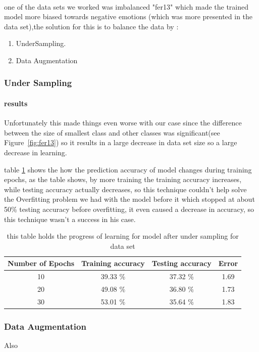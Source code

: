 \paragraph{}
one of the data sets we worked was imbalanced "fer13" which made the trained model more biased towards negative emotions (which was more presented in the data set),the solution for this is to balance the data by :
\begin{enumerate}
	\item UnderSampling.
	\item Data Augmentation
\end{enumerate}
\subsubsection{Under Sampling}
\paragraph{results}
Unfortunately this made things even worse with our case since the difference between the size of smallest class and other classes was significant(see Figure~\ref{fig:fer13}) so it results in a large decrease in data set size so a large decrease in learning. \newline

table \ref{tab:table1} shows the how the prediction accuracy of model changes during training epochs, as the table shows, by more training the training accuracy increases, while testing accuracy actually decreases, so this technique couldn't help solve the Overfitting problem we had with the model before it which stopped at about 50\% testing accuracy before overfitting, it even caused a decrease in accuracy, so this technique wasn't a success in his case. 
\begin{table}[h!]
	\centering
	\caption{this table holds the progress of learning for model after under sampling for data set}
	\label{tab:table1}
	\begin{tabular}{c | c | c | c}
		\textbf{Number of Epochs} & \textbf{Training accuracy} & \textbf{Testing accuracy} & \textbf{Error}\\ \hline 
		10 & 39.33 \% & 37.32 \% & 1.69 \\
		20 & 49.08 \% & 36.80 \% & 1.73 \\
		30 & 53.01 \% & 35.64 \% & 1.83 \\
	\end{tabular}
\end{table}

\subsubsection{Data Augmentation}
Also 











